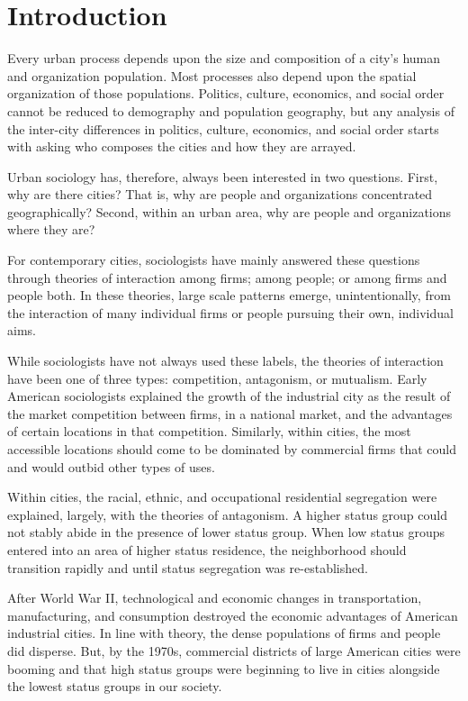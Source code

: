 \section{Introduction}
Every urban process depends upon the size and composition of a city's
human and organization population. Most processes also depend upon the
spatial organization of those populations. Politics, culture,
economics, and social order cannot be reduced to demography and
population geography, but any analysis of the inter-city differences in
politics, culture, economics, and social order starts with asking who
composes the cities and how they are arrayed.

Urban sociology has, therefore, always been interested in two
questions. First, why are there cities? That is, why are people and
organizations concentrated geographically? Second, within an urban
area, why are people and organizations where they are?

For contemporary cities, sociologists have mainly answered these
questions through theories of interaction among firms; among people;
or among firms and people both. In these theories, large scale
patterns emerge, unintentionally, from the interaction of many
individual firms or people pursuing their own, individual aims. 

While sociologists have not always used these labels, the theories of
interaction have been one of three types: competition, antagonism, or
mutualism. Early American sociologists explained the growth of the
industrial city as the result of the market competition between firms,
in a national market, and the advantages of certain locations in that
competition. Similarly, within cities, the most accessible locations
should come to be dominated by commercial firms that could and would
outbid other types of uses. 

Within cities, the racial, ethnic, and occupational residential
segregation were explained, largely, with the theories of
antagonism. A higher status group could not stably abide in the
presence of lower status group. When low status groups entered into an
area of higher status residence, the neighborhood should transition
rapidly and until status segregation was re-established.

After World War II, technological and economic changes in
transportation, manufacturing, and consumption destroyed the economic
advantages of American industrial cities. In line with theory, the
dense populations of firms and people did disperse. But, by the 1970s,
commercial districts of large American cities were booming and that
high status groups were beginning to live in cities alongside the
lowest status groups in our society. 

